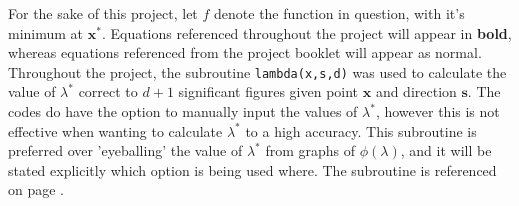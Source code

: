 \documentclass[10pt,a4paper,notitlepage]{article}
\author{Jonah Gibbon}
\newcommand{\x}{\mathbf{x}}
\newcommand{\s}{\mathbf{s}}
\begin{document}
For the sake of this project, let $f$ denote the function in question, with it's minimum at $\x^{*}$. Equations referenced throughout the project will appear in \textbf{bold}, whereas equations referenced from the project booklet will appear as normal. \\

Throughout the project, the subroutine \texttt{lambda(x,s,d)} was used to calculate the value of $\lambda^{*}$ correct to $d+1$ significant figures given point $\x$ and direction $\s$. The codes do have the option to manually input the values of $\lambda^{*}$, however this is not effective when wanting to calculate $\lambda^{*}$ to a high accuracy. This subroutine is preferred over 'eyeballing' the value of $\lambda^{*}$ from graphs of $\phi(\lambda)$, and it will be stated explicitly which option is being used where. The subroutine is referenced on page \pageref{cd:0}.
\end{document}
